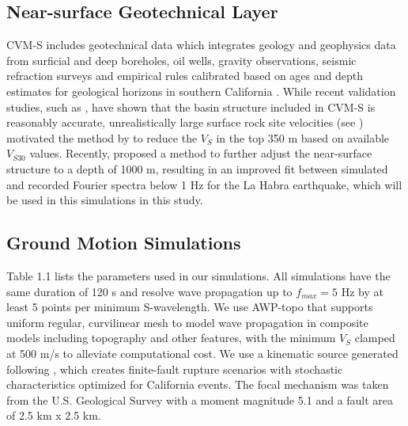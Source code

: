 \subsection{Near-surface Geotechnical Layer}
CVM-S includes geotechnical data which integrates geology and geophysics data from surficial and deep boreholes, oil wells, gravity observations, seismic refraction surveys and empirical rules calibrated based on ages and depth estimates for geological horizons in southern California \citep{magistraleGeologybased3DVelocity1996,magistraleSCECSouthernCalifornia2000}. While recent validation studies, such as \citet{tabordaEvaluationSouthernCalifornia2016}, have shown that the basin structure included in CVM-S is reasonably accurate, unrealistically large surface rock site velocities (see ) motivated the method by \citet{elyVs30derivedNearsurfaceSeismic2010} to reduce the $V_S$ in the top 350 m based on available $V_{S30}$ values. Recently, \citet{huCalibrationNearsurfaceSeismic2021} proposed a method to further adjust the near-surface structure to a depth of 1000 m, resulting in an improved fit between simulated and recorded Fourier spectra below 1 Hz for the La Habra earthquake, which will be used in this simulations in this study.

\subsection{Ground Motion Simulations}
Table 1.1 lists the parameters used in our simulations. All simulations have the same duration of 120 s and resolve wave propagation up to $f_{max}=5$ Hz by at least 5 points per minimum S-wavelength. We use AWP-topo that supports uniform regular, curvilinear mesh to model wave propagation in composite models including topography and other features, with the minimum $V_S$ clamped at 500 m/s to alleviate computational cost. We use a kinematic source generated following \citet{gravesKinematicGroundMotion2016}, which creates finite-fault rupture scenarios with stochastic characteristics optimized for California events. The focal mechanism was taken from the U.S. Geological Survey \citep[strike=233$^\circ$, dip=77$^\circ$, rake=49$^\circ$; ][]{usgsEarthquakeEventsFocal2014} with a moment magnitude 5.1 and a fault area of 2.5 km x 2.5 km. 


